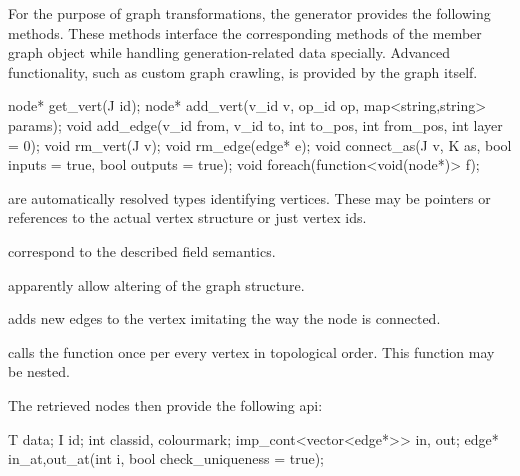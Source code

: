 For the purpose of graph transformations, the generator provides the following methods. These methods interface the corresponding methods of the member graph object while handling generation-related data specially. Advanced functionality, such as custom graph crawling, is provided by the graph itself.

\mybeginfig
\begin{code}
node* get_vert(J id);
node* add_vert(v_id v, op_id op, map<string,string> params);
void add_edge(v_id from, v_id to, int to_pos, int from_pos, int layer = 0);
void rm_vert(J v);
void rm_edge(edge* e);
void connect_as(J v, K as, bool inputs = true, bool outputs = true);
void foreach(function<void(node*)> f);
\end{code}

\begin{description}
  \item {} are automatically resolved types identifying vertices. These may be pointers or references to the actual vertex structure or just vertex ids.
  \item {} correspond to the described field semantics.
  \item {} apparently allow altering of the graph structure.
  \item {} adds new edges to the vertex  imitating the way the  node is connected.
  \item {} calls the function  once per every vertex in topological order. This function may be nested.
\end{description}

The retrieved nodes then provide the following api:

\mybeginfig
\begin{code}
T data; I id;
int classid, colourmark; 
imp_cont<vector<edge*>> in, out;
edge* in_at,out_at(int i, bool check_uniqueness = true);
\end{code}


